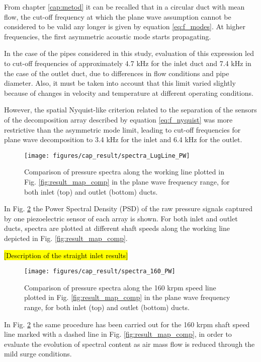 From chapter \ref{cap:metod} it can be recalled that in a circular duct with mean flow, the cut-off frequency at which the plane wave assumption cannot be considered to be valid any longer is given by equation \ref{eq:f_modes}. At higher frequencies, the first asymmetric acoustic mode starts propagating.

In the case of the pipes considered in this study, evaluation of this expression led to cut-off frequencies of approximately 4.7 kHz for the inlet duct and 7.4 kHz in the case of the outlet duct, due to differences in flow conditions and pipe diameter. Also, it must be taken into account that this limit varied slightly because of changes in velocity and temperature at different operating conditions.

However, the spatial Nyquist-like criterion related to the separation of the sensors of the decomposition array described by equation \ref{eq:f_nyquist} was more restrictive than the asymmetric mode limit, leading to cut-off frequencies for plane wave decomposition to 3.4 kHz for the inlet and 6.4 kHz for the outlet.

\begin{figure}[tbh!]
\centering
\texttt{[image: figures/cap\_result/spectra\_LugLine\_PW]}
\caption{Comparison of pressure spectra along the working line plotted in Fig. \ref{fig:result_map_comp} in the plane wave frequency range, for both inlet (top) and outlet (bottom) ducts.}
\label{fig:result_spectra_LugLine_PW}
\end{figure}

In Fig. \ref{fig:result_spectra_LugLine_PW} the Power Spectral Density (PSD) of the raw pressure signals captured by one piezoelectric sensor of each array is shown. For both inlet and outlet ducts, spectra are plotted at different shaft speeds along the working line depicted in Fig. \ref{fig:result_map_comp}.

\hl{[Description of the straight inlet results]}

\begin{figure}[tbh!]
\centering
\texttt{[image: figures/cap\_result/spectra\_160\_PW]}
\caption{Comparison of pressure spectra along the 160 krpm speed line plotted in Fig. \ref{fig:result_map_comp} in the plane wave frequency range, for both inlet (top) and outlet (bottom) ducts.}
\label{fig:result_spectra_LugLine_PW}
\end{figure}

In Fig. \ref{fig:result_spectra_LugLine_PW} the same procedure has been carried out for the 160 krpm shaft speed line marked with a dashed line in Fig. \ref{fig:result_map_comp}, in order to evaluate the evolution of spectral content as air mass flow is reduced through the mild surge conditions. 

